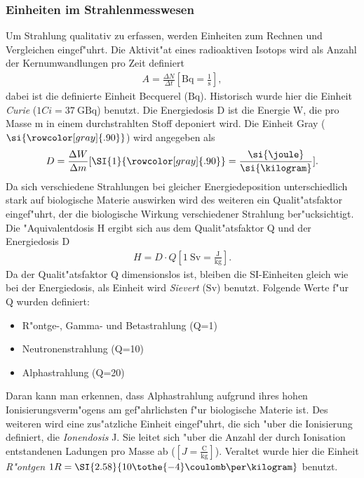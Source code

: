 \documentclass[12pt]{article}
\newcommand{\gray}{\rowcolor[gray]{.90}}
\begin{document}
\subsubsection{Einheiten im Strahlenmesswesen}
\label{ch:einheiten}
Um Strahlung qualitativ zu erfassen, werden Einheiten zum Rechnen und Vergleichen eingef"uhrt. Die Aktivit"at eines radioaktiven Isotops wird als Anzahl der Kernumwandlungen pro Zeit definiert
\begin{align}
A=\frac{\Delta N}{\Delta t} [\si{\becquerel}=\frac{1}{\si{\second}}],
\end{align}
dabei ist die definierte Einheit Becquerel ($\si{\becquerel}$). Historisch wurde hier die Einheit \textit{Curie} ($1Ci=\SI{37}{\giga\becquerel}$) benutzt.
Die Energiedosis D ist die Energie W, die pro Masse m in einem durchstrahlten Stoff deponiert wird. Die Einheit Gray ($\si{\gray}$) wird angegeben als
\begin{align}
D=\frac{\Delta W}{\Delta m} [\SI{1}{\gray}=\frac{\si{\joule}}{\si{\kilogram}}].
\end{align}
Da sich verschiedene Strahlungen bei gleicher Energiedeposition unterschiedlich stark auf biologische Materie auswirken wird des weiteren ein Qualit"atsfaktor eingef"uhrt, der die biologische Wirkung verschiedener Strahlung ber"ucksichtigt. Die "Aquivalentdosis H ergibt sich aus dem Qualit"atsfaktor Q und der Energiedosis D
\begin{align}
H=D\cdot Q [\SI{1}{\sievert}=\frac{\si{\joule}}{\si{\kilogram}}].
\end{align} 
Da der Qualit"atsfaktor Q dimensionslos ist, bleiben die SI-Einheiten gleich wie bei der Energiedosis, als Einheit wird \textit{Sievert} ($\si{\sievert}$) benutzt. Folgende Werte f"ur Q wurden definiert:
\begin{itemize}
	\item R"ontge-, Gamma- und Betastrahlung (Q=1)
	\item Neutronenstrahlung (Q=10)
	\item Alphastrahlung (Q=20)
\end{itemize}
Daran kann man erkennen, dass Alphastrahlung aufgrund ihres hohen Ionisierungsverm"ogens am gef"ahrlichsten f"ur biologische Materie ist. Des weiteren wird eine zus"atzliche Einheit eingef"uhrt, die sich "uber die Ionisierung definiert, die \textit{Ionendosis} J. Sie leitet sich "uber die Anzahl der durch Ionisation entstandenen Ladungen pro Masse ab ($[J=\frac{\si{\coulomb}}{\si{\kilogram}}]$). Veraltet wurde hier die Einheit \textit{R"ontgen} $1R=\SI{2.58}{10\tothe{-4}\coulomb\per\kilogram}$ benutzt. \par 
\end{document}
